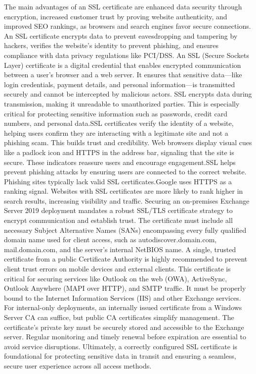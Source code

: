 The main advantages of an SSL certificate are enhanced data security through encryption, increased customer trust by proving website authenticity, and improved SEO rankings, as browsers and search engines favor secure connections. An SSL certificate encrypts data to prevent eavesdropping and tampering by hackers, verifies the website's identity to prevent phishing, and ensures compliance with data privacy regulations like PCI/DSS. An SSL (Secure Sockets Layer) certificate is a digital credential that enables encrypted communication between a user's browser and a web server. It ensures that sensitive data—like login credentials, payment details, and personal information—is transmitted securely and cannot be intercepted by malicious actors. SSL encrypts data during transmission, making it unreadable to unauthorized parties. This is especially critical for protecting sensitive information such as passwords, credit card numbers, and personal data.SSL certificates verify the identity of a website, helping users confirm they are interacting with a legitimate site and not a phishing scam. This builds trust and credibility. Web browsers display visual cues like a padlock icon and HTTPS in the address bar, signaling that the site is secure. These indicators reassure users and encourage engagement.SSL helps prevent phishing attacks by ensuring users are connected to the correct website. Phishing sites typically lack valid SSL certificates.Google uses HTTPS as a ranking signal. Websites with SSL certificates are more likely to rank higher in search results, increasing visibility and traffic. Securing an on-premises Exchange Server 2019 deployment mandates a robust SSL/TLS certificate strategy to encrypt communication and establish trust. The certificate must include all necessary Subject Alternative Names (SANs) encompassing every fully qualified domain name used for client access, such as autodiscover.domain.com, mail.domain.com, and the server's internal NetBIOS name. A single, trusted certificate from a public Certificate Authority is highly recommended to prevent client trust errors on mobile devices and external clients. This certificate is critical for securing services like Outlook on the web (OWA), ActiveSync, Outlook Anywhere (MAPI over HTTP), and SMTP traffic. It must be properly bound to the Internet Information Services (IIS) and other Exchange services. For internal-only deployments, an internally issued certificate from a Windows Server CA can suffice, but public CA certificates simplify management. The certificate's private key must be securely stored and accessible to the Exchange server. Regular monitoring and timely renewal before expiration are essential to avoid service disruptions. Ultimately, a correctly configured SSL certificate is foundational for protecting sensitive data in transit and ensuring a seamless, secure user experience across all access methods.


